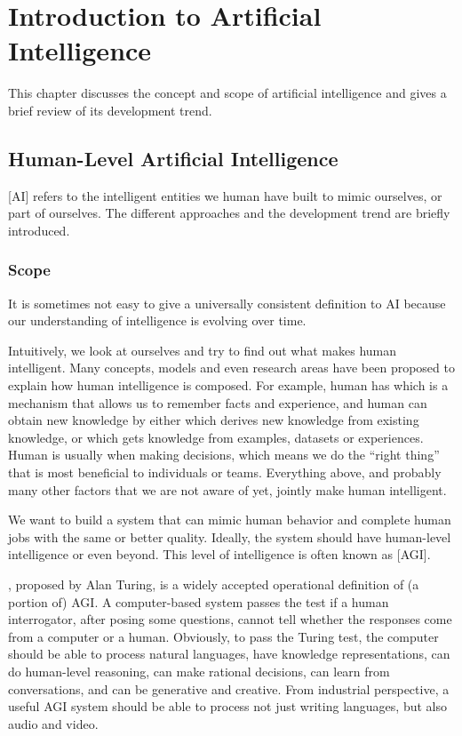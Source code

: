 \chapter{Introduction to Artificial Intelligence}

This chapter discusses the concept and scope of artificial intelligence and gives a brief review of its development trend.

\section{Human-Level Artificial Intelligence}

[AI] refers to the intelligent entities we human have built to mimic ourselves, or part of ourselves. The different approaches and the development trend are briefly introduced.

\subsection{Scope}

It is sometimes not easy to give a universally consistent definition to AI because our understanding of intelligence is evolving over time. 

Intuitively, we look at ourselves and try to find out what makes human intelligent. Many concepts, models and even research areas have been proposed to explain how human intelligence is composed. For example, human has  which is a mechanism that allows us to remember facts and experience, and human can obtain new knowledge by either  which derives new knowledge from existing knowledge, or  which gets knowledge from examples, datasets or experiences. Human is usually  when making decisions, which means we do the ``right thing'' that is most beneficial to individuals or teams. Everything above, and probably many other factors that we are not aware of yet, jointly make human intelligent.

We want to build a system that can mimic human behavior and complete human jobs with the same or better quality. Ideally, the system should have human-level intelligence or even beyond. This level of intelligence is often known as [AGI]. 

, proposed by Alan Turing, is a widely accepted operational definition of (a portion of) AGI. A computer-based system passes the test if a human interrogator, after posing some questions, cannot tell whether the responses come from a computer or a human. Obviously, to pass the Turing test, the computer should be able to process natural languages, have knowledge representations, can do human-level reasoning, can make rational decisions, can learn from conversations, and can be generative and creative. From industrial perspective, a useful AGI system should be able to process not just writing languages, but also audio and video.

